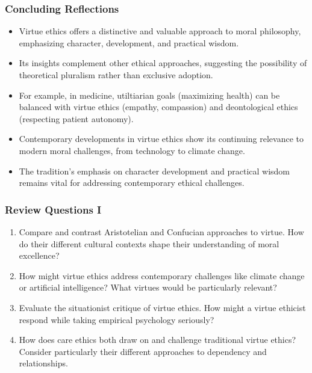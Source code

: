 \documentclass{beamer}
\begin{document}
\begin{frame}
    \frametitle{Concluding Reflections}
    \begin{itemize}
        \item Virtue ethics offers a distinctive and valuable approach to moral philosophy, emphasizing character, development, and practical wisdom.
        
        \item Its insights complement other ethical approaches, suggesting the possibility of theoretical pluralism rather than exclusive adoption. 
        
        \item For example, in medicine, utiltiarian goals (maximizing health) can be balanced with virtue ethics (empathy, compassion) and deontological ethics (respecting patient autonomy).
        
        \item Contemporary developments in virtue ethics show its continuing relevance to modern moral challenges, from technology to climate change.
        
        \item The tradition's emphasis on character development and practical wisdom remains vital for addressing contemporary ethical challenges.
    \end{itemize}
\end{frame}

\begin{frame}
    \frametitle{Review Questions I}
    \begin{enumerate}
        \item Compare and contrast Aristotelian and Confucian approaches to virtue. How do their different cultural contexts shape their understanding of moral excellence?
        
        \item How might virtue ethics address contemporary challenges like climate change or artificial intelligence? What virtues would be particularly relevant?
        
        \item Evaluate the situationist critique of virtue ethics. How might a virtue ethicist respond while taking empirical psychology seriously?
        
        \item How does care ethics both draw on and challenge traditional virtue ethics? Consider particularly their different approaches to dependency and relationships.
    \end{enumerate}
\end{frame}
\end{document}

